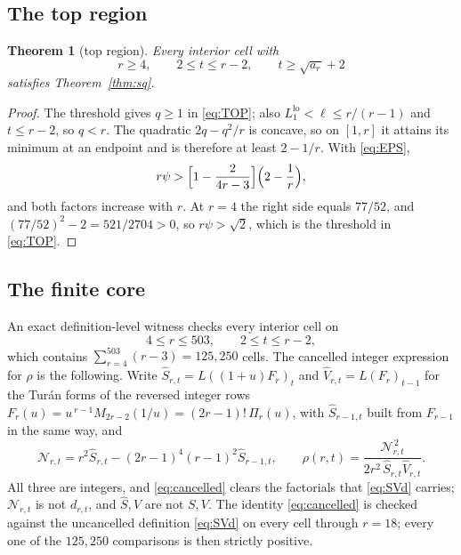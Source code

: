 \documentclass[11pt,a4paper]{article}
\theoremstyle{plain}
\newtheorem{theorem}{Theorem}[section]
\theoremstyle{definition}
\theoremstyle{remark}
\begin{document}
\subsection{The top region}

\begin{theorem}[top region]\label{thm:top}
Every interior cell with
\begin{equation}\label{eq:TOPREG}
  r\ge4,\qquad 2\le t\le r-2,\qquad t\ge\sqrt{a_r}+2
\end{equation}
satisfies Theorem~\ref{thm:sq}.
\end{theorem}

\begin{proof}
The threshold gives $q\ge1$ in \eqref{eq:TOP}; also
$L_1^{\mathrm{lo}}<\ell\le r/(r-1)$ and $t\le r-2$, so $q<r$. The quadratic
$2q-q^2/r$ is concave, so on $[1,r]$ it attains its minimum at an endpoint and
is therefore at least $2-1/r$. With \eqref{eq:EPS},
\[
  r\psi>\Bigl[1-\frac{2}{4r-3}\Bigr]\Bigl(2-\frac1r\Bigr),
\]
and both factors increase with $r$. At $r=4$ the right side equals $77/52$, and
$(77/52)^2-2=521/2704>0$, so $r\psi>\sqrt2$, which is the threshold in
\eqref{eq:TOP}.
\end{proof}

\subsection{The finite core}\label{sec:finitecore}

An exact definition-level witness checks every interior cell on
\begin{equation}\label{eq:finitecore}
  4\le r\le503,\qquad 2\le t\le r-2,
\end{equation}
which contains
$\sum_{r=4}^{503}(r-3)=125{,}250$ cells. The cancelled integer expression for
$\rho$ is the following. Write $\widehat S_{r,t}=L((1+u)F_r)_t$ and
$\widehat V_{r,t}=L(F_r)_{t-1}$ for the Tur\'an forms of the reversed integer
rows $F_r(u)=u^{\,r-1}M_{2r-2}(1/u)=(2r-1)!\,\Pi_r(u)$, with
$\widehat S_{r-1,t}$ built from $F_{r-1}$ in the same way, and
\begin{equation}\label{eq:cancelled}
  \mathcal N_{r,t}=r^2\widehat S_{r,t}-(2r-1)^4(r-1)^2\widehat S_{r-1,t},
  \qquad
  \rho(r,t)=\frac{\mathcal N_{r,t}^{\,2}}{2r^2\,\widehat S_{r,t}\widehat V_{r,t}} .
\end{equation}
All three are integers, and \eqref{eq:cancelled} clears the factorials that
\eqref{eq:SVd} carries; $\mathcal N_{r,t}$ is not $d_{r,t}$, and
$\widehat S,\widehat V$ are not $S,V$. The identity \eqref{eq:cancelled} is
checked against the uncancelled definition \eqref{eq:SVd} on every cell through
$r=18$; every one of the $125{,}250$ comparisons is then strictly positive.
\end{document}
